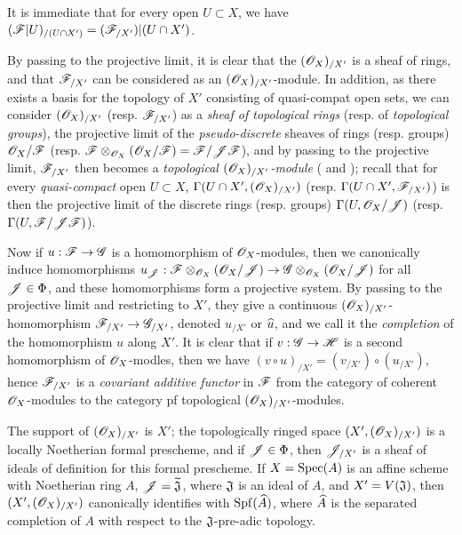 It is immediate that for every open $U\subset X$, we have $(\mathscr{F}|U)_{/(U\cap X')}=(\mathscr{F}_{/X'})|(U\cap X')$.

By passing to the projective limit, it is clear that the $(\mathscr{O}_X)_{/X'}$ is a sheaf of rings, and that $\mathscr{F}_{/X'}$ can be considered as an $(\mathscr{O}_X)_{/X'}$-module.
In addition, as there exists a basis for the topology of $X'$ consisting of quasi-compat open sets, we can consider $(\mathscr{O}_X)_{/X'}$ (resp. $\mathscr{F}_{/X'}$) as a \emph{sheaf of topological rings} (resp. of \emph{topological groups}), the projective limit of the \emph{pseudo-discrete} sheaves of rings (resp. groups) $\mathscr{O}_X/\mathscr{F}$ (resp. $\mathscr{F}\otimes_{\mathscr{O}_X}(\mathscr{O}_X/\mathscr{F})=\mathscr{F}/\mathscr{J}\mathscr{F}$), and by passing to the projective limit, $\mathscr{F}_{/X'}$ then becomes a \emph{topological $(\mathscr{O}_X)_{/X'}$-module} ( and ); recall that for every \emph{quasi-compact} open $U\subset X$, $\Gamma(U\cap X',(\mathscr{O}_X)_{/X'})$ (resp. $\Gamma(U\cap X',\mathscr{F}_{/X'})$) is then the projective limit of the discrete rings (resp. groups) $\Gamma(U,\mathscr{O}_X/\mathscr{J})$ (resp. $\Gamma(U,\mathscr{F}/\mathscr{J}\mathscr{F})$).

Now if $u:\sh{F}\to\sh{G}$ is a homomorphism of $\mathscr{O}_X$-modules, then we canonically induce homomorphisms $u_\sh{J}:\sh{F}\otimes_{\OO_X}(\OO_X/\sh{J})\to\sh{G}\otimes_{\OO_X}(\OO_X/\sh{J})$ for all $\mathscr{J}\in\Phi$, and these homomorphisms form a projective system.
By passing to the projective limit and restricting to $X'$, they give a continuous $(\mathscr{O}_X)_{/X'}$-homomorphism $\sh{F}_{/X'}\to\sh{G}_{/X'}$, denoted $u_{/X'}$ or $\widehat{u}$, and we call it the \emph{completion} of the homomorphism $u$ along $X'$.
It is clear that if $v:\sh{G}\to\sh{H}$ is a second homomorphism of $\mathscr{O}_X$-modles, then we have $(v\circ u)_{/X'}=(v_{/X'})\circ(u_{/X'})$, hence $\mathscr{F}_{/X'}$ is a \emph{covariant additive functor} in $\mathscr{F}$ from the category of coherent $\mathscr{O}_X$-modules to the category pf topological $(\mathscr{O}_X)_{/X'}$-modules.

\begin{prop}[10.8.5]
\label{1.10.8.5}
The support of $(\mathscr{O}_X)_{/X'}$ is $X'$; the topologically ringed space $(X',(\mathscr{O}_X)_{/X'})$ is a locally Noetherian formal prescheme, and if $\mathscr{J}\in\Phi$, then $\mathscr{J}_{/X'}$ is a sheaf of ideals of definition for this formal prescheme.
If $X={\mathop{\mathrm{Spec}}\nolimits}(A)$ is an affine scheme with Noetherian ring $A$, $\mathscr{J}=\widetilde{\mathfrak{J}}$, where $\mathfrak{J}$ is an ideal of $A$, and $X'=V(\mathfrak{J})$, then $(X',(\mathscr{O}_X)_{/X'})$ canonically identifies with ${\mathop{\mathrm{Spf}}\nolimits}(\widehat{A})$, where $\widehat{A}$ is the separated completion of $A$ with respect to the $\mathfrak{J}$-pre-adic topology.
\end{prop}

